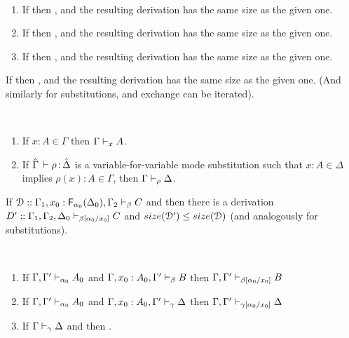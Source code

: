 \begin{lemma} \label{lem:weakening} ~
\begin{enumerate}
\item If  then
, and the resulting
derivation has the same size as the given one.  
\item If  then
, and the resulting
derivation has the same size as the given one.  
\item If  then
, and the resulting
derivation has the same size as the given one.  
\end{enumerate}
\end{lemma}

\begin{lemma} \label{lem:exchange}
If  then
, and the resulting derivation
has the same size as the given one.  (And similarly for substitutions,
and exchange can be iterated).  
\end{lemma}

\begin{theorem}[Identity] ~ \label{thm:identity}
\begin{enumerate}
\item If $x:A \in \Gamma$ then $\Gamma \vdash_{x} A$.
\item If $\hat{\Gamma} \, \vdash \rho \, \mathit{:} \, \hat{\Delta}$ is a
  variable-for-variable mode substitution such that $x:A \in \Delta$
  implies $\rho(x) : A \in \Gamma$, then $\Gamma \vdash_{\rho} \Delta$.
\end{enumerate}
\end{theorem}

\begin{lemma} \label{lem:Finv}
If $\mathcal{D} :: \Gamma_1,x_0:\mathsf{F}_{\alpha_0}(\Delta_0),\Gamma_2 \vdash_{\beta} C$
and then there is a derivation $D' ::
\Gamma_1,\Gamma_2,\Delta_0 \vdash_{\beta[\alpha_0/x_0]} C$ and
$size(\mathcal{D}') \le size(\mathcal{D})$ (and analogously for substitutions).
\end{lemma}

\begin{theorem}[Cut] ~ \label{thm:cut}
\begin{enumerate} 
\item  If $\Gamma,\Gamma' \vdash_{\alpha_0} A_0$ and $\Gamma,x_0:A_0,\Gamma' \vdash_{\beta} B$ 
then $\Gamma,\Gamma' \vdash_{\beta[\alpha_0/x_0]} B$ 
\item If $\Gamma,\Gamma' \vdash_{\alpha_0} A_0$ and $\Gamma,x_0:A_0,\Gamma' \vdash_{\gamma} \Delta$ 
then $\Gamma,\Gamma' \vdash_{\gamma[\alpha_0/x_0]} \Delta$ 
\item If $\Gamma \vdash_{\gamma} \Delta$ and 
then .  
\end{enumerate}
\end{theorem}

